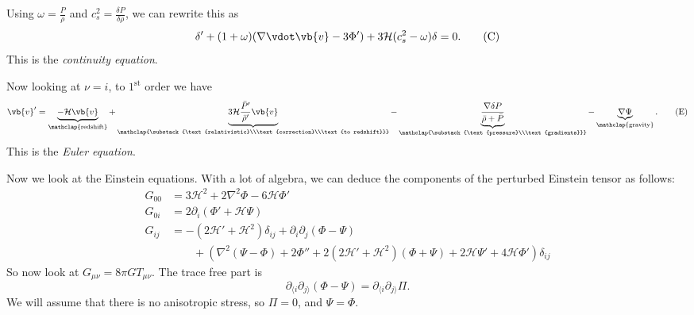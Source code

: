 \documentclass{jknotes}
\begin{document}
Using \(\omega = \frac{P}\rho\) and \(c_s^2 = \frac{\delta P}{\delta \rho}\), we can rewrite this as
\begin{equation}
    \delta'+(1+\omega)(\nabla\vdot\vb{v}-3\Phi') + 3\mathcal{H}(c_s^2-\omega)\delta = 0.
    \tag{C}
    \label{C}
\end{equation}
This is the \emph{continuity equation}.

Now looking at \(\nu = i\), to \(1^{\mathrm{st}}\) order we have
\begin{equation}
    \vb{v}' = \underbrace{-\mathcal{H}\vb{v}}_{\mathclap{\text{redshift}}} + \underbrace{3\mathcal{H}\frac{\bar{P}'}{\bar\rho'}\vb{v}}_{\mathclap{\substack{\text{relativistic}\\\text{correction}\\\text{to redshift}}}} - \underbrace{\frac{\nabla\delta P}{\bar{\rho}+\bar{P}}}_{\mathclap{\substack{\text{pressure}\\\text{gradients}}}} - \underbrace{\nabla\Psi}_{\mathclap{\text{gravity}}}.
    \tag{E}
    \label{E}
\end{equation}
This is the \emph{Euler equation}.

Now we look at the Einstein equations. With a lot of algebra, we can deduce the components of the perturbed Einstein tensor as follows:
\begin{align}
    G_{00} &= 3\mathcal{H}^2 + 2\nabla^2\Phi - 6\mathcal{H}\Phi' \\
    G_{0i} &= 2\partial_i(\Phi' + \mathcal{H}\Psi) \\
    G_{ij} &= -(2\mathcal{H}'+\mathcal{H}^2)\delta_{ij} + \partial_i\partial_j(\Phi-\Psi) \\
           &\qquad + \left(\nabla^2(\Psi - \Phi) + 2\Phi'' + 2(2\mathcal{H}'+\mathcal{H}^2)(\Phi+\Psi) + 2\mathcal{H}\Psi' + 4\mathcal{H}\Phi'\right)\delta_{ij}
\end{align}
So now look at \(G_{\mu\nu} = 8\pi G T_{\mu\nu}\). The trace free part is
\begin{equation}
    \partial_{\langle i}\partial_{j\rangle}(\Phi-\Psi) = \partial_{\langle i}\partial_{j\rangle}\Pi.
\end{equation}
We will assume that there is no anisotropic stress, so \(\Pi=0\), and \(\Psi = \Phi\).
\end{document}
